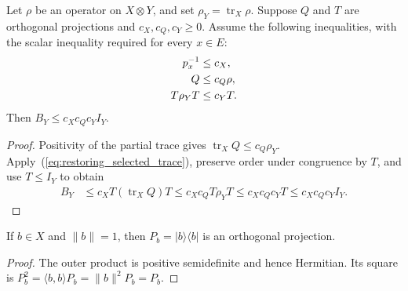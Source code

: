 \begin{theorem}
    \label{thm:restoring_gram_bound}
    \leanok
    Let $\rho$ be an operator on $X\otimes Y$, and set
    $\rho_Y=\operatorname{tr}_X\rho$. Suppose $Q$ and $T$ are
    orthogonal projections and $c_X,c_Q,c_Y\ge0$. Assume the following
    inequalities, with the scalar inequality required for every $x\in E$:
    \begin{align}
        p_x^{-1}&\le c_X,\label{eq:restoring_spectral_bounds}\\
        Q&\le c_Q\rho,\notag\\
        T\rho_YT&\le c_YT.\notag
    \end{align}
    Then $B_Y\le c_Xc_Qc_Y I_Y$.
\end{theorem}
\begin{proof}\leanok
    Positivity of the partial trace gives
    $\operatorname{tr}_XQ\le c_Q\rho_Y$.
    Apply~(\ref{eq:restoring_selected_trace}), preserve order under
    congruence by $T$, and use $T\le I_Y$ to obtain
    \begin{align*}
        B_Y
        &\le c_X T(\operatorname{tr}_XQ)T
        \le c_Xc_Q T\rho_YT
        \le c_Xc_Qc_Y T
        \le c_Xc_Qc_Y I_Y.
    \end{align*}
\end{proof}

\begin{theorem}
    \label{thm:restoring_unit_blank}
    \leanok
    If $b\in X$ and $\|b\|=1$, then $P_b=|b\rangle\langle b|$
    is an orthogonal projection.
\end{theorem}
\begin{proof}\leanok
    The outer product is positive semidefinite and hence Hermitian.
    Its square is $P_b^2=\langle b,b\rangle P_b=\|b\|^2P_b=P_b$.
\end{proof}

